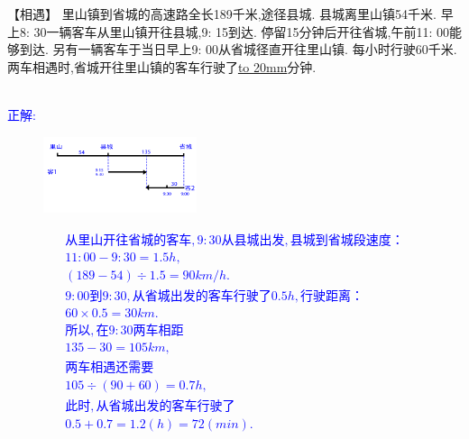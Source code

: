 \item {
    【相遇】
    里山镇到省城的高速路全长189千米,途径县城. 县城离里山镇54千米. 早上8: 30一辆客车从里山镇开往县城,9: 15到达. 停留15分钟后开往省城,午前11: 00能够到达. 另有一辆客车于当日早上9: 00从省城径直开往里山镇. 每小时行驶60千米. 两车相遇时,省城开往里山镇的客车行驶了\underline{\hbox to 20mm{}}分钟.
    \ifshowSolution 
        \fangsong{}\textcolor{blue}{
            \\正解: \\
            \begin{figure}[H] 
                \centering
                \includegraphics[width=0.4\textwidth]{./pics/Chapter_3/seikai_1.png}
            \end{figure}
            \begin{gather*}
                从里山开往省城的客车,9:30从县城出发,县城到省城段速度：\\
                    11:00 - 9:30 = 1.5 h,\\
                    (189-54)\div 1.5=90 km/h.\\
                9:00到9:30, 从省城出发的客车行驶了0.5h,行驶距离：\\
                    60\times 0.5 = 30km.\\
                所以,在9:30两车相距\\
                    135 - 30 = 105 km,\\
                两车相遇还需要\\
                105\div (90+60) = 0.7h,\\
                此时,从省城出发的客车行驶了\\
                0.5 + 0.7 = 1.2(h) = 72(min).
            \end{gather*}
        }
    \else
        \vspace{1cm}
    \fi
}

